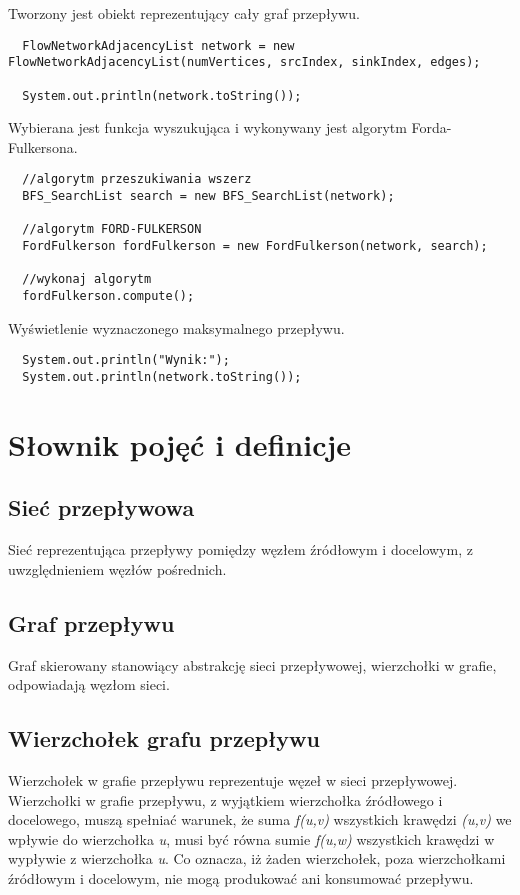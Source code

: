 \documentclass[10pt]{minutes}
\begin{document}
Tworzony jest obiekt reprezentujący cały graf przepływu.
\begin{lstlisting}      
  FlowNetworkAdjacencyList network = new FlowNetworkAdjacencyList(numVertices, srcIndex, sinkIndex, edges);  
        
  System.out.println(network.toString());
\end{lstlisting}

Wybierana jest funkcja wyszukująca i wykonywany jest algorytm Forda-Fulkersona.
\begin{lstlisting}
  //algorytm przeszukiwania wszerz
  BFS_SearchList search = new BFS_SearchList(network);

  //algorytm FORD-FULKERSON
  FordFulkerson fordFulkerson = new FordFulkerson(network, search);

  //wykonaj algorytm
  fordFulkerson.compute();
\end{lstlisting}

Wyświetlenie wyznaczonego maksymalnego przepływu.
\begin{lstlisting}        
  System.out.println("Wynik:");
  System.out.println(network.toString());
\end{lstlisting}
       

\section{Słownik pojęć i definicje}
\subsection{Sieć przepływowa}
Sieć reprezentująca przepływy pomiędzy węzłem źródłowym i docelowym, z uwzględnieniem węzłów pośrednich.
\subsection{Graf przepływu}
Graf skierowany stanowiący abstrakcję sieci przepływowej, wierzchołki w grafie, odpowiadają węzłom sieci.
\subsection{Wierzchołek grafu przepływu}
Wierzchołek w grafie przepływu reprezentuje węzeł w sieci przepływowej. Wierzchołki w grafie przepływu, z wyjątkiem wierzchołka źródłowego i docelowego, muszą spełniać warunek, że suma \emph{f(u,v)} wszystkich krawędzi \emph{(u,v)} we wpływie do wierzchołka \emph{u}, musi być równa sumie \emph{f(u,w)} wszystkich krawędzi w wypływie z wierzchołka \emph{u}. Co oznacza, iż żaden wierzchołek, poza wierzchołkami źródłowym i docelowym, nie mogą produkować ani konsumować przepływu.
\end{document}
